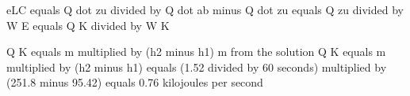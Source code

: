 eLC equals Q dot zu divided by Q dot ab minus Q dot zu equals Q zu divided by W E equals Q K divided by W K  

Q K equals m multiplied by (h2 minus h1)  
m from the solution  
Q K equals m multiplied by (h2 minus h1)  
equals (1.52 divided by 60 seconds) multiplied by (251.8 minus 95.42)  
equals 0.76 kilojoules per second